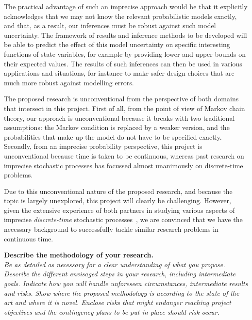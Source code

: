 \documentclass[11pt,dvipsnames,usenames,a4paper]{article}
\begin{document}
The practical advantage of such an imprecise approach would be that it explicitly acknowledges that we may not know the relevant probabilistic models exactly, and that, as a result, our inferences must be robust against such model uncertainty. 
The framework of results and inference methods to be developed will be able to predict the effect of this model uncertainty on specific interesting functions of state variables, for example by providing lower and upper bounds on their expected values. 
The results of such inferences can then be used in various applications and situations, for instance to make safer design choices that are much more robust against modelling errors.

The proposed research is unconventional from the perspective of both domains that intersect in this project.
First of all, from the point of view of Markov chain theory, our approach is unconventional because it breaks with two traditional assumptions: the Markov condition is replaced by a weaker version, and the probabilities that make up the model do not have to be specified exactly. Secondly, from an imprecise probability perspective, this project is unconventional because time is taken to be continuous, whereas past research on imprecise stochastic processes has focussed almost unanimously on discrete-time problems.

Due to this unconventional nature of the proposed research, and because the topic is largely unexplored, this project will clearly be challenging. 
However, given the extensive experience of both partners in studying various aspects of imprecise \emph{discrete-time} stochastic processes~\cite{cooman2007d,cooman2008,hermans2012,cooman2015:markovergodic}, we are convinced that we have the necessary background to successfully tackle similar research problems in continuous time.


\vspace{7pt}

\textbf{Describe the methodology of your research.}\\
\textit{Be as detailed as necessary for a clear understanding of what you propose.
Describe the different envisaged steps in your research, including intermediate goals. Indicate how you will handle unforeseen circumstances, intermediate results and risks.
Show where the proposed methodology is according to the state of the art and where it is novel.
Enclose risks that might endanger reaching project objectives and the contingency plans to be put in place should risk occur.}
\end{document}
